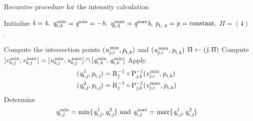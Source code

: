 \begin{algorithm}
\caption{Recursive procedure for the intensity calculation}\label{alg}
Initialize { $\textit{k}=4,$  $\textit{q}_{\textrm{t,} \textit{$4$}}^\textrm{\,min} = \textit{q}^{\textrm{min}} =  -\textit{b},$ 
 $\textit{q}_{\textrm{t,} \textit{$4$}}^ \textrm{\,max}= \textit{q}^{\textrm{max}}\textit{b},$ $\textit{p}_{\textrm{t, } \textit{$4$}} = \textit{p}_{\textrm{} \textit{}} =  \textrm{constant},$  $\Pi = (4)$. }
\begin{algorithmic}[1]
   \If{$\lineai\neq\lineaj$}
   \State Compute the intersection points 
    $(\textit{u}_{j, i}^\textrm{\,min}, \textit{p}_{\textrm{t,} \textit{\textit{k}}})$ and $(\textit{u}_{j, i}^\textrm{\,max}, \textit{p}_{\textrm{t,} \textit{\textit{k}}})$
 \State $\Pi\gets(\textit{j}, \Pi)$
           \State Compute 
     $      [\textit{v}_{\textit{k}, \textit{j}}^\textrm{\,min}, \textit{v}_{\textit{k}, \textit{j}}^\textrm{\,max}] = [\textit{u}_{\textit{k}, \textit{j}}^\textrm{\,min}, \textit{u}_{\textit{k}, \textit{j}}^\textrm{\,max}]\cap
           [\textit{q}_{\textrm{t,} \textit{\textit{k}}}^\textrm{\,min}, \textit{q}_{\textrm{t,} \textit{\textit{k}}}^\textrm{\,min}] $
           \State Apply 
           \begin{equation*}
           \begin{aligned}
           (\textit{q}_{\textrm{t,} \textit{\textit{j}}}^{\,1}, \textit{p}_{\textrm{t,} \textit{\textit{j}}})& =\mathrm{R}_{{\textit{j}}}^{-1}\circ \mathrm{P}_{{\textit{j},\textit{k}}}^{-1}(\textit{v}_{j,i}^\textrm{\,min}, \textit{p}_{\textrm{t,} \textit{\textit{k}}})  \\
           (\textit{q}_{\textrm{t,} \textit{\textit{j}}}^{\,2}, \textit{p}_{\textrm{t,} \textit{\textit{j}}}) & =\mathrm{R}_{{\textit{j}}}^{-1}\circ \mathrm{P}_{{\textit{j},\textit{k}}}^{-1}(\textit{v}_{j,i}^\textrm{\,max}, \textit{p}_{\textrm{t,} \textit{\textit{k}}})
           \end{aligned}
           \end{equation*}
           \State Determine \begin{equation*}
\textit{q}_{\textrm{t,} \textit{\textit{j}}}^\textrm{\,min}= \min\{\textit{q}_{\textrm{t,} \textit{\textit{j}}}^{\,1}, \textit{q}_{\textrm{t,} \textit{\textit{j}}}^{\,2}\} \mbox{ and }
\textit{q}_{\textrm{t,} \textit{\textit{j}}}^\textrm{\,max}= \max\{\textit{q}_{\textrm{t,} \textit{\textit{j}}}^{\,1}, \textit{q}_{\textrm{t,} \textit{\textit{j}}}^{\,2}\}
\end{equation*}
          \State{}

\end{algorithmic}
\end{algorithm}
